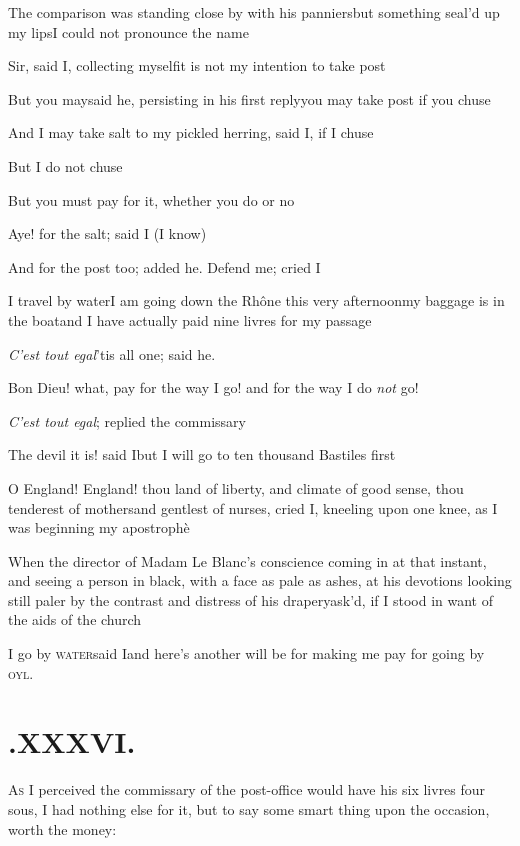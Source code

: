 \documentclass{article}
\begin{document}
The comparison was standing close by with his panniers\tsk but
something seal’d up my lips\tsk I could not pronounce the
name\tsh

Sir, said I, collecting myself\tsk it is not my intention to
take post\tsh

\tsk But you may\tsk said he, persisting in his first
reply\tsk you may take post if you chuse\tsh

\tsk And I may take salt to my pickled herring, said I, if I
chuse\tsh

\tsk But I do not chuse\tsk

\tsk But you must pay for it, whether you do or no\tsh

Aye! for the salt; said I (I know)\tsh

\newpage
\tsk And for the post too; added he. Defend me; cried
I\tsh

I travel by water\tsk I am going down the Rhône this very afternoon\tsk my baggage is in
the boat\tsk and I have actually paid nine livres for my passage\tsh

\textit{C’est tout egal}\tsk ’tis all one; said
he.

Bon Dieu! what, pay for the way I go! and for the way I
do \textit{not} go!

\tsh \textit{C’est tout egal}; replied the
commissary\tsh

\tsh The devil it is! said I\tsk but I will go to ten
thousand Bastiles first\tsh

O England! England! thou land of liberty, and
climate of good sense, thou tenderest of mothers\tsk and gentlest
of nurses, cried I, kneeling upon one knee, as I was beginning my
apostrophè\tsh

\newpage
When the director of Madam Le Blanc’s conscience
coming in at that instant, and seeing a person in black, with a
face as pale as ashes, at his devotions\break
\tsk looking still paler by the contrast and distress of his
drapery\tsk ask’d, if I stood in want of the aids of the
church\tsh

I go by \textsc{water}\tsk said I\tsk and here’s
another will be for making me pay for going by
\textsc{oyl}.

\section{.\enspace XXXVI.}

\lettrine{A}{\!s} I perceived the commissary of the
post-office would have his six livres four sous, I had nothing else
for it, but to say some smart thing upon the occasion, worth the
money:
\end{document}
